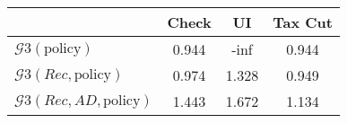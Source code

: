 \begin{tabular}{@{}lccc@{}} 
\toprule 
                          & Check      & UI    & Tax Cut    \\  \midrule 
$\mathcal{G}3(\text{policy})$ & 0.944  & -inf  & 0.944     \\ 
$\mathcal{G}3(Rec,\text{policy})$ & 0.974  & 1.328  & 0.949     \\ 
$\mathcal{G}3(Rec, AD,\text{policy})$ & 1.443  & 1.672  & 1.134     \\ 
\end{tabular}  
